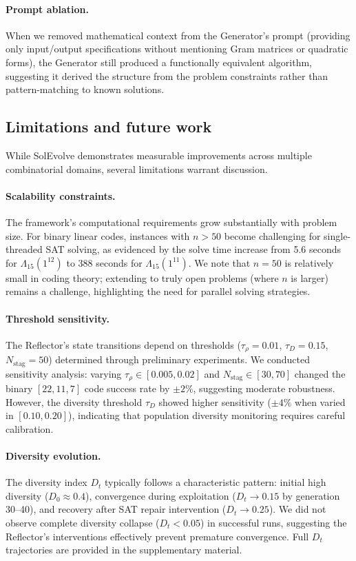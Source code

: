 \paragraph{Prompt ablation.} When we removed mathematical context from the Generator's prompt (providing only input/output specifications without mentioning Gram matrices or quadratic forms), the Generator still produced a functionally equivalent algorithm, suggesting it derived the structure from the problem constraints rather than pattern-matching to known solutions.

\subsection{Limitations and future work}

While SolEvolve demonstrates measurable improvements across multiple combinatorial domains, several limitations warrant discussion.

\paragraph{Scalability constraints.} The framework's computational requirements grow substantially with problem size. For binary linear codes, instances with $n > 50$ become challenging for single-threaded SAT solving, as evidenced by the solve time increase from 5.6 seconds for $\Lambda_{15}(1^{12})$ to 388 seconds for $\Lambda_{15}(1^{11})$. We note that $n=50$ is relatively small in coding theory; extending to truly open problems (where $n$ is larger) remains a challenge, highlighting the need for parallel solving strategies.

\paragraph{Threshold sensitivity.} The Reflector's state transitions depend on thresholds ($\tau_\rho = 0.01$, $\tau_D = 0.15$, $N_{\text{stag}} = 50$) determined through preliminary experiments. We conducted sensitivity analysis: varying $\tau_\rho \in [0.005, 0.02]$ and $N_{\text{stag}} \in [30, 70]$ changed the binary $[22,11,7]$ code success rate by $\pm 2\%$, suggesting moderate robustness. However, the diversity threshold $\tau_D$ showed higher sensitivity ($\pm 4\%$ when varied in $[0.10, 0.20]$), indicating that population diversity monitoring requires careful calibration.

\paragraph{Diversity evolution.} The diversity index $D_t$ typically follows a characteristic pattern: initial high diversity ($D_0 \approx 0.4$), convergence during exploitation ($D_t \to 0.15$ by generation 30--40), and recovery after SAT repair intervention ($D_t \to 0.25$). We did not observe complete diversity collapse ($D_t < 0.05$) in successful runs, suggesting the Reflector's interventions effectively prevent premature convergence. Full $D_t$ trajectories are provided in the supplementary material.

